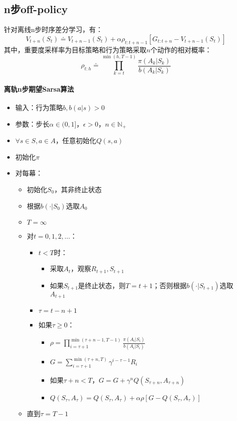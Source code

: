 \documentclass[
12pt, %
a4paper, 
oneside, %
headinclude,footinclude, %
]{scrartcl}
\begin{document}
\subsection{n步off-policy}
针对离线n步时序差分学习，有：
$$ V_{t + n}(S_t) \doteq V_{t + n - 1}(S_t) + \alpha \rho_{t:t + n - 1}[G_{t:t + n} - V_{t + n - 1}(S_t)] $$
其中，重要度采样率为目标策略和行为策略采取$ n $个动作的相对概率：
$$ \rho_{t:h} \doteq \prod_{k = t}^{\min(h,T - 1)} \frac{\pi(A_k|S_k)}{b(A_k|S_k)} $$
\paragraph{离轨n步期望Sarsa算法}
\begin{itemize}
\item 输入：行为策略$ b, b(a|s) > 0 $
\item 参数：步长$ \alpha \in (0,1] $，$ \epsilon > 0 $，$ n \in \mathbb{N}_+ $
\item $ \forall s \in S, a \in A $，任意初始化$ Q(s, a) $
\item 初始化$ \pi $
\item 对每幕：
\begin{itemize}
\item 初始化$ S_0 $，其非终止状态
\item 根据$ b(\cdot|S_0) $选取$ A_0 $
\item $ T = \infty $
\item 对$ t = 0, 1, 2, \dots $：
\begin{itemize}
\item $ t < T $时：
\begin{itemize}
\item 采取$ A_t $，观察$ R_{t + 1}, S_{t + 1} $
\item 如果$ S_{t + 1} $是终止状态，则$ T = t + 1 $；否则根据$ b(\cdot|S_{t + 1}) $选取$ A_{t + 1} $
\end{itemize}
\item $ \tau = t - n + 1 $
\item 如果$ \tau \geq 0 $：
\begin{itemize}
\item $ \rho = \prod_{i = \tau + 1}^{\min(\tau + n - 1,T - 1)} \frac{\pi(A_i|S_i)}{b(A_i|S_i)} $
\item $ G = \sum_{i = \tau + 1}^{\min(\tau + n, T)} \gamma^{i - \tau - 1}R_i $
\item 如果$ \tau + n < T $，$ G = G + \gamma^n Q(S_{\tau + n}, A_{\tau + n}) $ 
\item $ Q(S_{\tau},A_{\tau}) = Q(S_{\tau},A_{\tau}) + \alpha \rho[G - Q(S_{\tau},A_{\tau})] $
\end{itemize}
\end{itemize}
\item 直到$ \tau = T - 1 $
\end{itemize}
\end{itemize}
\end{document}
